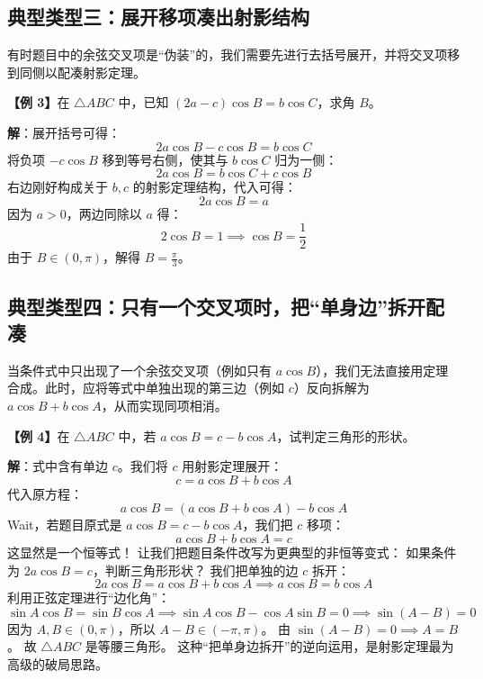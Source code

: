 \documentclass[11pt, a4paper]{ctexart}
\begin{document}
\subsection{典型类型三：展开移项凑出射影结构}
有时题目中的余弦交叉项是“伪装”的，我们需要先进行去括号展开，并将交叉项移到同侧以配凑射影定理。
\begin{tcolorbox}[colback=white, colframe=black!60, boxrule=0.5pt, arc=1pt, before skip=0.2em, after skip=0.2em]
\textbf{【例 3】}在 $\triangle ABC$ 中，已知 $(2a-c)\cos B = b\cos C$，求角 $B$。
\end{tcolorbox}
\textbf{解}：展开括号可得：
\[
2a\cos B - c\cos B = b\cos C
\]
将负项 $-c\cos B$ 移到等号右侧，使其与 $b\cos C$ 归为一侧：
\[
2a\cos B = b\cos C + c\cos B
\]
右边刚好构成关于 $b, c$ 的射影定理结构，代入可得：
\[
2a\cos B = a
\]
因为 $a > 0$，两边同除以 $a$ 得：
\[
2\cos B = 1 \implies \cos B = \frac{1}{2}
\]
由于 $B \in (0, \pi)$，解得 $B = \frac{\pi}{3}$。

\subsection{典型类型四：只有一个交叉项时，把“单身边”拆开配凑}
当条件式中只出现了一个余弦交叉项（例如只有 $a\cos B$），我们无法直接用定理合成。此时，应将等式中单独出现的第三边（例如 $c$）反向拆解为 $a\cos B + b\cos A$，从而实现同项相消。
\begin{tcolorbox}[colback=white, colframe=black!60, boxrule=0.5pt, arc=1pt, before skip=0.2em, after skip=0.2em]
\textbf{【例 4】}在 $\triangle ABC$ 中，若 $a\cos B = c - b\cos A$，试判定三角形的形状。
\end{tcolorbox}
\textbf{解}：式中含有单边 $c$。我们将 $c$ 用射影定理展开：
\[
c = a\cos B + b\cos A
\]
代入原方程：
\[
a\cos B = (a\cos B + b\cos A) - b\cos A
\]
Wait，若题目原式是 $a\cos B = c - b\cos A$，我们把 $c$ 移项：
\[
a\cos B + b\cos A = c
\]
这显然是一个恒等式！
让我们把题目条件改写为更典型的非恒等变式：
如果条件为 $2a\cos B = c$，判断三角形形状？
我们把单独的边 $c$ 拆开：
\[
2a\cos B = a\cos B + b\cos A \implies a\cos B = b\cos A
\]
利用正弦定理进行“边化角”：
\[
\sin A\cos B = \sin B\cos A \implies \sin A\cos B - \cos A\sin B = 0 \implies \sin(A-B) = 0
\]
因为 $A, B \in (0, \pi)$，所以 $A-B \in (-\pi, \pi)$。
由 $\sin(A-B) = 0 \implies A = B$。
故 $\triangle ABC$ 是等腰三角形。
这种“把单身边拆开”的逆向运用，是射影定理最为高级的破局思路。
\end{document}
